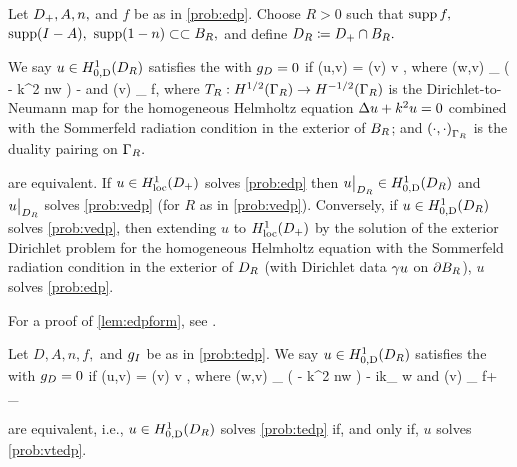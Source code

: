 \bprob[Variational formulation of EDP when $\gD = 0$]\label{prob:vedp}
Let $D_{+}, A, n,$ and $f$ be as in \cref{prob:edp}. Choose $R>0$ such that $\operatorname{supp} f,$ $\operatorname{supp}(I-A),$ $\operatorname{supp}(1-n) \subset\subset B_{R},$ and define $D_{R} \coloneqq D_{+} \cap B_{R}.$

We say $u \in \HozDDR$ satisfies the  with $\gD = 0$ if
\beqs
\aE(u,v) = \FE(v) \tfa v \in \HozDDR,
\eeqs
where
\beqs
\aE(w,v) \de \int_{\DR} \mleft( - k^2 n\minispace w \vbar\mright) - 
\eeqs
and
\beqs
\FE(v) \de \int_{\DR} f\minispace\vbar,
\eeqs
where $\DtN:\HhGR\rightarrow \HmhGR$ is the Dirichlet-to-Neumann map for the homogeneous Helmholtz equation $\Delta u + k^2 u = 0$ combined with the Sommerfeld radiation condition in the exterior of $B_{R}$; and $\DPGR{\cdot}{\cdot}$ is the duality pairing on $\Gamma_{R}.$
\eprob

\label{lem:edpform}
 are equivalent. If $u \in \HolocDp$ solves \cref{prob:edp} then $u\restrict_{\DR} \in \HozDDR$ and $u\big|_{D_{R}}$ solves \cref{prob:vedp}  (for $R$ as in \cref{prob:vedp}). Conversely, if $u \in \HozDDR$ solves \cref{prob:vedp}, then extending $u$ to $\HolocDp$ by the solution of the exterior Dirichlet problem for the homogeneous Helmholtz equation with the Sommerfeld radiation condition in the exterior of $D_{R}$ (with Dirichlet data $\gamma u$ on $\partial B_{R}$), $u$ solves \cref{prob:edp}.
\ele

For a proof of \cref{lem:edpform}, see \cite[Lemma 3.3]{GrPeSp:19}.

\bprob[Variational formulation of TEDP when $\gD = 0$]\label{prob:vtedp}
Let $D, A, n, f,$ and $g_{I}$ be as in \cref{prob:tedp}. We say $u \in \HozDDR$ satisfies the  with $\gD = 0$ if
\beqs
\aT(u,v) = \FT(v) \tfa v \in \HozDDR,
\eeqs
where
\beqs
\aT(w,v) \de \int_{\DR} \mleft( - k^2 n\minispace w \vbar\mright) - ik\int_{\GI} \trGI w\minispace\trGI \vbar
\eeqs
and
\beqs
\FT(v) \de \int_{\DR} f\minispace\vbar + \int_{\GI} \gI \minispace\trGI \vbar
\eeqs
\eprob
{}

\label{lem:tedpform}
 are equivalent, i.e., $u \in \HozDDR$ solves \cref{prob:tedp} if, and only if, $u$ solves \cref{prob:vtedp}.
\ele

